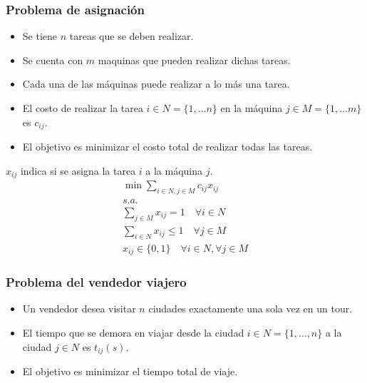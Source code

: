 \documentclass[../main.tex]{subfiles}
\begin{document}
\subsubsection{Problema de asignación}
\begin{minipage}[t]{.45\textwidth}
  \begin{itemize}
    \item Se tiene $n$ tareas que se deben realizar.
    \item Se cuenta con $m$ maquinas que pueden realizar dichas tareas.
    \item Cada una de las máquinas puede realizar a lo más una tarea.
    \item El costo de realizar la tarea $i \in N = \{ 1, \ldots n \}$ en la máquina $j \in M = \{ 1, \ldots m \}$ es $c_{ij}$.
    \item El objetivo es minimizar el costo total de realizar todas las tareas.\footnotemark{}
  \end{itemize}
\end{minipage}
\hfill
\begin{minipage}[t]{.45\textwidth}
  $x_{ij}$ indica si se asigna la tarea $i$ a la máquina $j$.
  \begin{gather*}
    \min \sum_{i \in N, j \in M} c_{ij} x_{ij} \\
    s.a. \\
    \sum_{j \in M} x_{ij} = 1 \quad \forall i \in N \\
    \sum_{i \in N} x_{ij} \leq 1 \quad \forall j \in M \\
    x_{ij} \in \{0, 1\} \quad \forall i \in N, \forall j \in M
  \end{gather*}
\end{minipage}

\subsubsection{Problema del vendedor viajero}
\begin{itemize}
  \item Un vendedor desea visitar $n$ ciudades exactamente una sola vez en un tour.
  \item El tiempo que se demora en viajar desde la ciudad $i \in N = \{ 1, \ldots, n \}$ a la ciudad $j \in N$ es $t_{ij}(s)$.
  \item El objetivo es minimizar el tiempo total de viaje.
\end{itemize}
\end{document}
